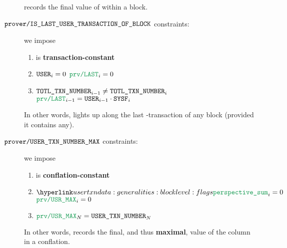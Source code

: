 \begin{description}
                \proverColC{} records the final value of \proverColB{} within a block.
        \item[$\texttt{prover\texttt{/}IS\_LAST\_USER\_TRANSACTION\_OF\_BLOCK} {}$ constraints:]
                we impose
                \begin{enumerate}
                        \item \proverColD{} is \textbf{transaction-constant}
                        \item \If $\texttt{USER} _{i} = 0$ \Then $\proverColD _{i} = 0$
                        \item
                                \If   $\texttt{TOTL}\texttt{\_}\texttt{TXN\_NUMBER} _{i - 1} \neq \texttt{TOTL}\texttt{\_}\texttt{TXN\_NUMBER} _{i}$
                                \Then $\proverColD _{i - 1}                   =    \user _{i - 1} \cdot \sysf _{i}$
                \end{enumerate}
                \saNote{}
                In other words,
                \proverColD{} lights up along the last \user{}-transaction of any block
                (provided it contains any).
        \item[$\texttt{prover\texttt{/}\texttt{USER}\texttt{\_}\texttt{TXN\_NUMBER}\_MAX} {}$ constraints:]
                we impose
                \begin{enumerate}
                        \item \proverColA{} is \textbf{conflation-constant}
                        \item \If $\perspectiveSum _{i} = 0$ \Then $\proverColA _{i} = 0$
                        \item $\proverColA _{N} = \userTransactionNumber _{N}$
                \end{enumerate}
                \saNote{}
                In other words,
                \proverColA{} records the final, and thus \textbf{maximal},
                value of the \userTransactionNumber{} column in a conflation.
\end{description}
